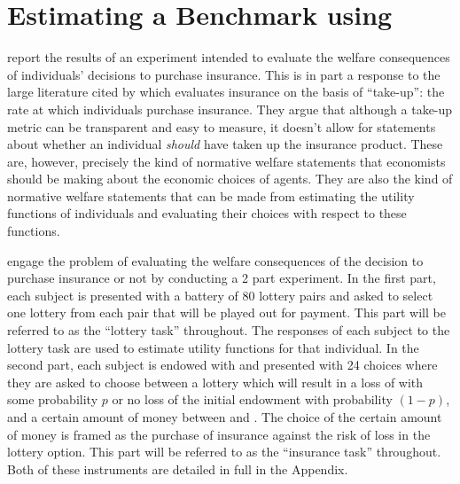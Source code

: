 \documentclass[../main.tex]{subfiles}
\begin{document}
\section{Estimating a Benchmark using \texorpdfstring{\textcite{Harrison2016}}{Harrison and Ng (2015)}}

\textcite{Harrison2016} report the results of an experiment intended to evaluate the welfare consequences of individuals' decisions to purchase insurance.
This is in part a response to the large literature cited by \textcite[1]{Harrison2016} which evaluates insurance on the basis of \enquote{take-up}: the rate at which individuals purchase insurance.
They argue that although a take-up metric can be transparent and easy to measure, it doesn't allow for statements about whether an individual \textit{should} have taken up the insurance product.
These are, however, precisely the kind of normative welfare statements that economists should be making about the economic choices of agents.
They are also the kind of normative welfare statements that can be made from estimating the utility functions of individuals and evaluating their choices with respect to these functions.


\textcite{Harrison2016} engage the problem of evaluating the welfare consequences of the decision to purchase insurance or not by conducting a 2 part experiment.
In the first part, each subject is presented with a battery of 80 lottery pairs and asked to select one lottery from each pair that will be played out for payment.
This part will be referred to as the \enquote{lottery task} throughout.
The responses of each subject to the lottery task are used to estimate utility functions for that individual.
In the second part, each subject is endowed with  and presented with 24 choices where they are asked to choose between a lottery which will result in a loss of  with some probability $p$ or no loss of the initial endowment with probability $(1-p)$, and a certain amount of money between  and .
The choice of the certain amount of money is framed as the purchase of insurance against the risk of loss in the lottery option.
This part will be referred to as the \enquote{insurance task} throughout.
Both of these instruments are detailed in full in the Appendix.
\end{document}
